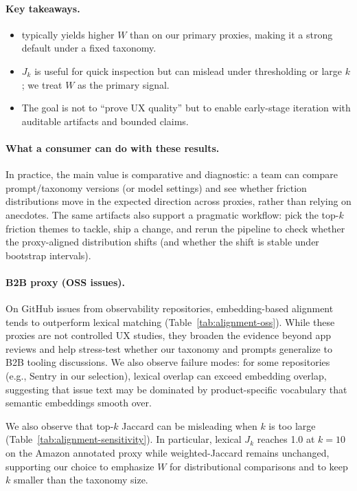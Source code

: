 \paragraph{Key takeaways.}
\begin{itemize}
  \item \MethodEmbed{} typically yields higher $W$ than \MethodLex{} on our primary proxies, making it a strong default under a fixed taxonomy.
  \item $J_k$ is useful for quick inspection but can mislead under thresholding or large $k$; we treat $W$ as the primary signal.
  \item The goal is not to ``prove UX quality'' but to enable early-stage iteration with auditable artifacts and bounded claims.
\end{itemize}

\paragraph{What a consumer can do with these results.}
In practice, the main value is comparative and diagnostic: a team can compare prompt/taxonomy versions (or model settings)
and see whether friction distributions move in the expected direction across proxies, rather than relying on anecdotes.
The same artifacts also support a pragmatic workflow: pick the top-$k$ friction themes to tackle, ship a change, and rerun the pipeline to check
whether the proxy-aligned distribution shifts (and whether the shift is stable under bootstrap intervals).

\paragraph{B2B proxy (OSS issues).}
On GitHub issues from observability repositories, embedding-based alignment tends to outperform lexical matching (Table~\ref{tab:alignment-oss}).
While these proxies are not controlled UX studies, they broaden the evidence beyond app reviews and help stress-test whether our taxonomy and prompts
generalize to B2B tooling discussions.
We also observe failure modes: for some repositories (e.g., Sentry in our selection), lexical overlap can exceed embedding overlap,
suggesting that issue text may be dominated by product-specific vocabulary that semantic embeddings smooth over.

We also observe that top-$k$ Jaccard can be misleading when $k$ is too large (Table~\ref{tab:alignment-sensitivity}).
In particular, lexical $J_k$ reaches 1.0 at $k=10$ on the Amazon annotated proxy while weighted-Jaccard remains unchanged,
supporting our choice to emphasize $W$ for distributional comparisons and to keep $k$ smaller than the taxonomy size.

